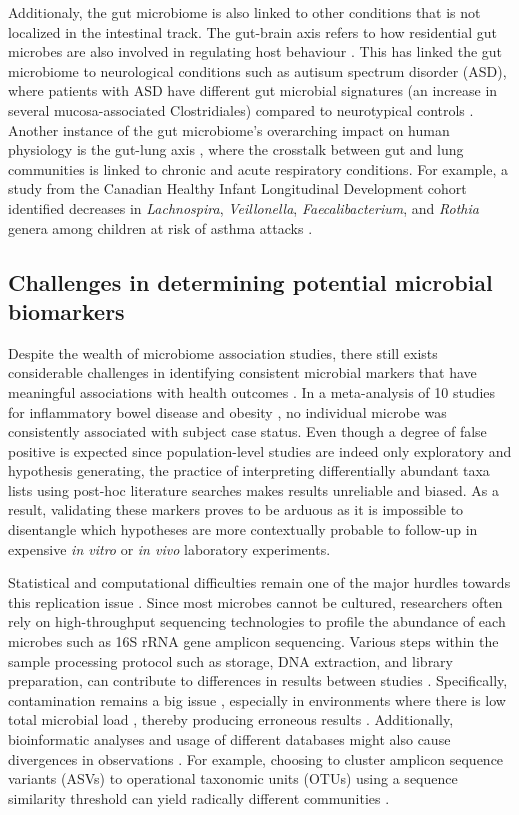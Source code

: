 Additionaly, the gut microbiome is also linked to other conditions that is not localized in the intestinal track. The gut-brain axis refers to how residential gut microbes are also involved in regulating host behaviour \cite{morais2021gut}. This has linked the gut microbiome to neurological conditions such as autisum spectrum disorder (ASD), where patients with ASD have different gut microbial signatures (an increase in several mucosa-associated Clostridiales) compared to neurotypical controls \cite{luna2017distinct}. Another instance of the gut microbiome's overarching impact on human physiology is the gut-lung axis \cite{enaud2020gutlung}, where the crosstalk between gut and lung communities is linked to chronic and acute respiratory conditions. For example, a study from the Canadian Healthy Infant Longitudinal Development cohort identified decreases in \emph{Lachnospira}, \emph{Veillonella}, \emph{Faecalibacterium}, and \emph{Rothia} genera among children at risk of asthma attacks \cite{arrietta2015early}. 


\subsection{Challenges in determining potential microbial biomarkers}
Despite the wealth of microbiome association studies, there still exists considerable challenges in identifying consistent microbial markers that have meaningful associations with health outcomes \cite{duvallet2017metaanalysis}. In a meta-analysis of 10 studies for inflammatory bowel disease and obesity \cite{walters2014metaanalyses}, no individual microbe was consistently associated with subject case status. Even though a degree of false positive is expected since population-level studies are indeed only exploratory and hypothesis generating, the practice of interpreting differentially abundant taxa lists using post-hoc literature searches makes results unreliable and biased. As a result, validating these markers proves to be arduous as it is impossible to disentangle which hypotheses are more contextually probable to follow-up in expensive \emph{in vitro} or \emph{in vivo} laboratory experiments.  

Statistical and computational difficulties remain one of the major hurdles towards this replication issue \cite{li2015microbiome, li2019comparative}. Since most microbes cannot be cultured, researchers often rely on high-throughput sequencing technologies to profile the abundance of each microbes such as 16S rRNA gene amplicon sequencing. Various steps within the sample processing protocol such as storage, DNA extraction, and library preparation, can contribute to differences in results between studies \cite{clausen2021evaluating}. Specifically, contamination remains a big issue \cite{}, especially in environments where there is low total microbial load \cite{}, thereby producing erroneous results \cite{}. Additionally, bioinformatic analyses and usage of different databases might also cause divergences in observations \cite{moossavi2020biological}. For example, choosing to cluster amplicon sequence variants (ASVs) to operational taxonomic units (OTUs) using a sequence similarity threshold can yield radically different communities \cite{chiarello2022ranking, moossavi2020biological}.   


